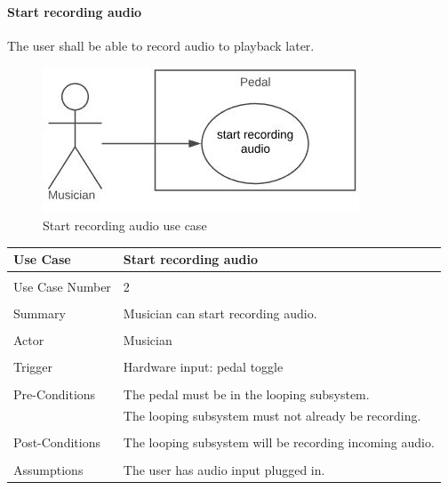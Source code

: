         \paragraph{Start recording audio} 
        The user shall be able to record audio to playback later.
                    \begin{figure}[!ht]
                \centering
                \includegraphics[width=.5\textwidth]{diagrams/use_cases/uc-record-start.JPG}
                \caption{Start recording audio use case}
                \label{fig:uc-record-start }
            \end{figure}
        \begin{table}[!ht]
            \centering
            \begin{tabular}{ l  l  }
                Use Case & Start recording audio  \\ \hline \\
                Use Case Number & 2 \\ \\
                Summary & Musician can start recording audio. \\ \\
                Actor & Musician \\ \\
                Trigger & Hardware input: pedal toggle \\ \\
                Pre-Conditions & The pedal must be in the looping subsystem. \\
                & The looping subsystem must not already be recording. \\ \\
                Post-Conditions & The looping subsystem will be recording incoming audio. \\ \\
                Assumptions & The user has audio input plugged in.\\
            \end{tabular}
        \end{table}
        
